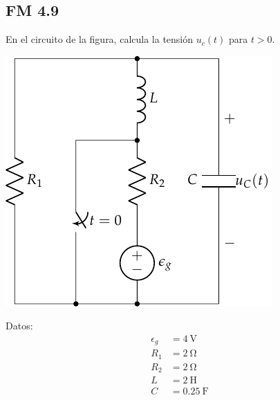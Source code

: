\documentclass[12pt]{article}
\begin{document}
\subsection{FM 4.9}

En el circuito de la figura, calcula la tensión $u_c(t)$ para $t > 0$.

\vspace*{1cm}

\begin{minipage}{0.7\textwidth}
  \includegraphics[scale=0.8]{figs/FM_4_9}
\end{minipage}
\hfill
\begin{minipage}{0.3\textwidth}
Datos:
\begin{align*}
  \epsilon_g &= \SI{4}{\volt}\\
  R_1 &= \SI{2}{\ohm}\\
  R_2 &= \SI{2}{\ohm}\\
  L &= \SI{2}{\henry}\\
  C &= \SI{0.25}{\farad}      
\end{align*}
\end{minipage}
\end{document}
